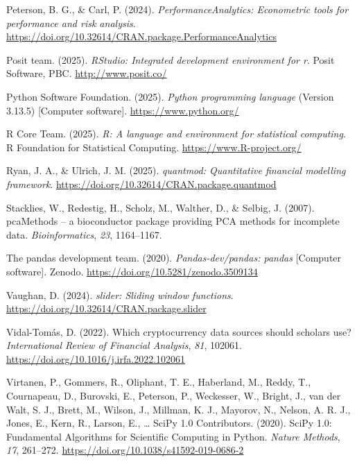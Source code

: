 \documentclass[
  12pt,
  a4paper,
  openany]{scrbook}
\newlength{\cslhangindent}
\newenvironment{CSLReferences}[2] %
 {\begin{list}{}{%
  \setlength{\itemindent}{0pt}
  \setlength{\leftmargin}{0pt}
  \setlength{\parsep}{0pt}
  \ifodd #1
   \setlength{\leftmargin}{\cslhangindent}
   \setlength{\itemindent}{-1\cslhangindent}
  \fi
  \setlength{\itemsep}{#2\baselineskip}}}
 {\end{list}}
\begin{document}
\begin{CSLReferences}{1}{0}
Peterson, B. G., \& Carl, P. (2024). \emph{{PerformanceAnalytics}:
Econometric tools for performance and risk analysis}.
\url{https://doi.org/10.32614/CRAN.package.PerformanceAnalytics}

Posit team. (2025). \emph{{RStudio}: Integrated development environment
for r}. Posit Software, PBC. \url{http://www.posit.co/}

Python Software Foundation. (2025). \emph{Python programming language}
(Version 3.13.5) {[}Computer software{]}. \url{https://www.python.org/}

R Core Team. (2025). \emph{R: A language and environment for statistical
computing}. R Foundation for Statistical Computing.
\url{https://www.R-project.org/}

Ryan, J. A., \& Ulrich, J. M. (2025). \emph{{quantmod}: Quantitative
financial modelling framework}.
\url{https://doi.org/10.32614/CRAN.package.quantmod}

Stacklies, W., Redestig, H., Scholz, M., Walther, D., \& Selbig, J.
(2007). pcaMethods -- a bioconductor package providing PCA methods for
incomplete data. \emph{Bioinformatics}, \emph{23}, 1164--1167.

The pandas development team. (2020). \emph{Pandas-dev/pandas: pandas}
{[}Computer software{]}. Zenodo.
\url{https://doi.org/10.5281/zenodo.3509134}

Vaughan, D. (2024). \emph{{slider}: Sliding window functions}.
\url{https://doi.org/10.32614/CRAN.package.slider}

Vidal-Tomás, D. (2022). Which cryptocurrency data sources should
scholars use? \emph{International Review of Financial Analysis},
\emph{81}, 102061. \url{https://doi.org/10.1016/j.irfa.2022.102061}

Virtanen, P., Gommers, R., Oliphant, T. E., Haberland, M., Reddy, T.,
Cournapeau, D., Burovski, E., Peterson, P., Weckesser, W., Bright, J.,
van der Walt, S. J., Brett, M., Wilson, J., Millman, K. J., Mayorov, N.,
Nelson, A. R. J., Jones, E., Kern, R., Larson, E., \ldots{} SciPy 1.0
Contributors. (2020). {{SciPy} 1.0: Fundamental Algorithms for
Scientific Computing in Python}. \emph{Nature Methods}, \emph{17},
261--272. \url{https://doi.org/10.1038/s41592-019-0686-2}


\end{CSLReferences}
\end{document}
